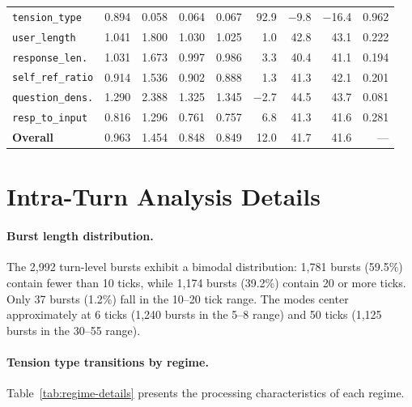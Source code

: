 \documentclass[twoside,11pt]{article}
\begin{document}
\begin{table}[h]
\begin{tabular}{@{}lrrrrrrrr@{}}
\texttt{tension\_type}     & 0.894 & 0.058 & 0.064 & 0.067 & 92.9 & $-$9.8 & $-$16.4 & 0.962 \\
\texttt{user\_length}      & 1.041 & 1.800 & 1.030 & 1.025 & 1.0 & 42.8 & 43.1 & 0.222 \\
\texttt{response\_len.}    & 1.031 & 1.673 & 0.997 & 0.986 & 3.3 & 40.4 & 41.1 & 0.194 \\
\texttt{self\_ref\_ratio}  & 0.914 & 1.536 & 0.902 & 0.888 & 1.3 & 41.3 & 42.1 & 0.201 \\
\texttt{question\_dens.}   & 1.290 & 2.388 & 1.325 & 1.345 & $-$2.7 & 44.5 & 43.7 & 0.081 \\
\texttt{resp\_to\_input}   & 0.816 & 1.296 & 0.761 & 0.757 & 6.8 & 41.3 & 41.6 & 0.281 \\
\midrule
\textbf{Overall}           & 0.963 & 1.454 & 0.848 & 0.849 & 12.0 & 41.7 & 41.6 & --- \\
\bottomrule
\end{tabular}
\end{table}


\section{Intra-Turn Analysis Details}
\label{app:intraturn}

\paragraph{Burst length distribution.} The 2,992 turn-level bursts exhibit a
bimodal distribution: 1,781 bursts (59.5\%) contain fewer than 10 ticks, while
1,174 bursts (39.2\%) contain 20 or more ticks. Only 37 bursts (1.2\%) fall in
the 10--20 tick range. The modes center approximately at 6 ticks (1,240 bursts
in the 5--8 range) and 50 ticks (1,125 bursts in the 30--55 range).

\paragraph{Tension type transitions by regime.} Table~\ref{tab:regime-details}
presents the processing characteristics of each regime.
\end{document}
